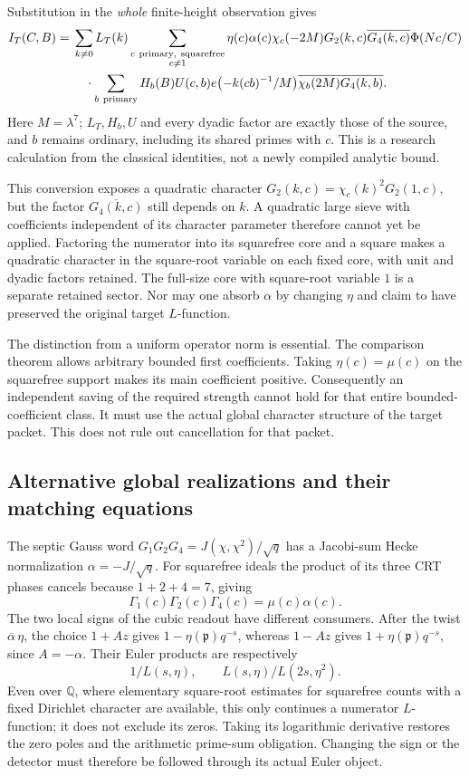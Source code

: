 \documentclass[11pt]{article}
\begin{document}
Substitution in the \emph{whole} finite-height observation gives
\[
\begin{split}
 I_T(C,B)={}&\sum_{k\ne0}L_T(k)
 \sum_{\substack{c\ {\rm primary,\ squarefree}\\c\ne1}}
 \eta(c)\alpha(c)\chi_c(-2M)G_2(k,c)
       \overline{G_4(k,c)}\Phi(Nc/C)\\
 &\quad\cdot\sum_{b\ {\rm primary}}
 H_b(B)U(c,b)e\bigl(-k(cb)^{-1}/M\bigr)
                  \overline{\chi_b(2M)G_4(k,b)} .
\end{split}
\]
Here \(M=\lambda^7\); \(L_T,H_b,U\) and every dyadic factor are exactly
those of the source, and \(b\) remains ordinary, including its shared
primes with \(c\). This is a research calculation from the classical
identities, not a newly compiled analytic bound.

This conversion exposes a quadratic character
\(G_2(k,c)=\chi_c(k)^2G_2(1,c)\), but the factor
\(\overline{G_4(k,c)}\) still depends on \(k\).
A quadratic large sieve with coefficients independent of its character
parameter therefore cannot yet be applied. Factoring the numerator
into its squarefree core and a square makes a quadratic character in
the square-root variable on each fixed core, with unit and dyadic
factors retained. The full-size core with square-root variable \(1\)
is a separate retained sector. Nor may one absorb \(\alpha\) by
changing \(\eta\) and claim to have preserved the original target
\(L\)-function.

The distinction from a uniform operator norm is essential. The
comparison theorem allows arbitrary bounded first coefficients.
Taking \(\eta(c)=\mu(c)\) on the squarefree support makes its main
coefficient positive. Consequently an independent saving of the
required strength cannot hold for that entire bounded-coefficient
class. It must use the actual global character structure of the
target packet. This does not rule out cancellation for that packet.

\subsection{Alternative global realizations and their matching equations}

The septic Gauss word \(G_1G_2G_4=J(\chi,\chi^2)/\sqrt q\) has a
Jacobi-sum Hecke normalization \(\alpha=-J/\sqrt q\).
For squarefree ideals the product of its three CRT phases cancels
because \(1+2+4=7\), giving
\[
 \Gamma_1(c)\Gamma_2(c)\Gamma_4(c)
       =\mu(c)\alpha(c).
\]
The two local signs of the cubic readout have different consumers.
After the twist \(\overline\alpha\,\eta\), the choice \(1+A z\)
gives \(1-\eta(\mathfrak p)q^{-s}\), whereas \(1-Az\) gives
\(1+\eta(\mathfrak p)q^{-s}\), since \(A=-\alpha\).
Their Euler products are respectively
\[
 1/L(s,\eta),\qquad L(s,\eta)/L(2s,\eta^2).
\]
Even over \(\mathbb Q\), where elementary square-root estimates for
squarefree counts with a fixed Dirichlet character are available,
this only continues a numerator \(L\)-function; it does not exclude
its zeros. Taking its logarithmic derivative restores the zero poles
and the arithmetic prime-sum obligation.
Changing the sign or the detector must therefore be followed through
its actual Euler object.
\end{document}
